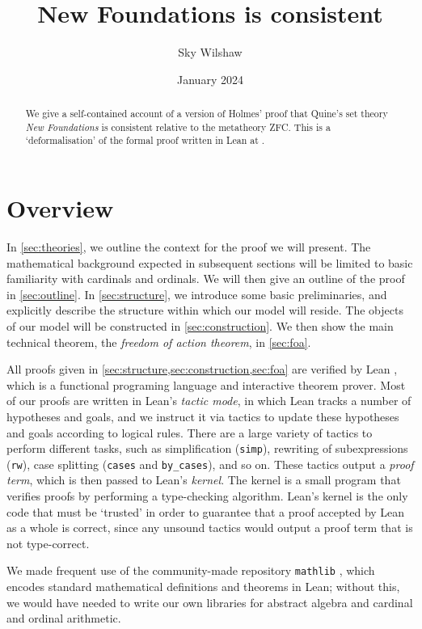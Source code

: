 \documentclass{article}
\title{New Foundations is consistent}
\author{Sky Wilshaw}
\date{January 2024}
\theoremstyle{definition}
\theoremstyle{remark}
\begin{document}
\maketitle

\begin{abstract}
	We give a self-contained account of a version of Holmes' proof \cite{holmes2023nf} that Quine's set theory \emph{New Foundations} \cite{quine-nf} is consistent relative to the metatheory ZFC.
	This is a `deformalisation' of the formal proof written in Lean at \cite{leanprover-community-con-nf}.
\end{abstract}

\tableofcontents

\section{Overview}

In \cref{sec:theories}, we outline the context for the proof we will present.
The mathematical background expected in subsequent sections will be limited to basic familiarity with cardinals and ordinals.
We will then give an outline of the proof in \cref{sec:outline}.
In \cref{sec:structure}, we introduce some basic preliminaries, and explicitly describe the structure within which our model will reside.
The objects of our model will be constructed in \cref{sec:construction}.
We then show the main technical theorem, the \emph{freedom of action theorem}, in \cref{sec:foa}.

All proofs given in \cref{sec:structure,sec:construction,sec:foa} are verified by Lean \cite{lean}, which is a functional programing language and interactive theorem prover.
Most of our proofs are written in Lean's \emph{tactic mode}, in which Lean tracks a number of hypotheses and goals, and we instruct it via tactics to update these hypotheses and goals according to logical rules.
There are a large variety of tactics to perform different tasks, such as simplification (\texttt{simp}), rewriting of subexpressions (\texttt{rw}), case splitting (\texttt{cases} and \texttt{by\_cases}), and so on.
These tactics output a \emph{proof term}, which is then passed to Lean's \emph{kernel}.
The kernel is a small program that verifies proofs by performing a type-checking algorithm.
Lean's kernel is the only code that must be `trusted' in order to guarantee that a proof accepted by Lean as a whole is correct, since any unsound tactics would output a proof term that is not type-correct.

We made frequent use of the community-made repository \texttt{mathlib} \cite{mathlib2020}, which encodes standard mathematical definitions and theorems in Lean; without this, we would have needed to write our own libraries for abstract algebra and cardinal and ordinal arithmetic.
\end{document}
